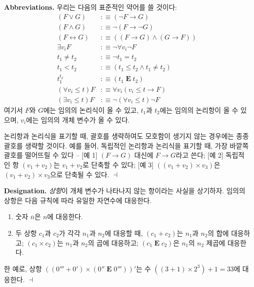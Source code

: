 \documentclass[12pt]{paper}
\newenvironment{context}[1][]{\noindent \textbf{{#1}.}}{\hfill $ \dashv $}
\begin{document}
  \begin{context}[Abbreviations]
    우리는 다음의 표준적인 약어를 쓸 것이다:
    \begin{align*}
      \left( F \lor G \right) & : \equiv \left( \lnot F \rightarrow G \right) \\
      \left( F \land G \right) & : \equiv \lnot \left( F \rightarrow \lnot G \right) \\
      \left( F \leftrightarrow G \right) & : \equiv \left( \left( F \rightarrow G \right) \land \left( G \rightarrow F \right) \right) \\
      \exists v_{i} F & : \equiv \lnot \forall v_{i} \lnot F \\
      t_{1} \neq t_{2} & : \equiv \lnot t_{1} = t_{2} \\
      t_{1} < t_{2} & : \equiv \left( t_{1} \leq t_{2} \land t_{1} \neq t_{2} \right) \\
      t_{1}^{t_{2}} & : \equiv \left( t_{1} \mathop{\mathbf{E}} t_{2} \right) \\
      \left( \forall v_{i} \leq t \right) F & : \equiv \forall v_{i} \left( v_{i} \leq t \rightarrow F \right) \\
      \left( \exists v_{i} \leq t \right) F & : \equiv \lnot \left( \forall v_{i} \leq t \right) \lnot F
    \end{align*}
    여기서 $F$와 $G$에는 임의의 논리식이 올 수 있고,
    $t_{1}$과 $t_{2}$에는 임의의 논리항이 올 수 있으며,
    $v_{i}$에는 임의의 개체 변수가 올 수 있다.

    논리항과 논리식을 표기할 때,
    괄호를 생략하여도 모호함이 생기지 않는 경우에는 종종 괄호를 생략할 것이다.
    예를 들어, 독립적인 논리항과 논리식을 표기할 때, 가장 바깥쪽 괄호를 떨어뜨릴 수 있다 --
    [예 1] $\left( F \rightarrow G \right)$ 대신에 $F \rightarrow G$라고 쓴다;
    [예 2] 독립적인 항 $\left( v_{1} + v_{2} \right)$는 $v_{1} + v_{2}$로 단축할 수 있다;
    [예 3] $\left( \left( v_{1} + v_{2} \right) \times v_{3} \right)$은 $\left( v_{1} + v_{2} \right) \times v_{3}$으로 단축될 수 있다.
  \end{context}

  \begin{context}[Designation]
    \textit{상항}이 개체 변수가 나타나지 않는 항이라는 사실을 상기하자.
    임의의 상항은 다음 규칙에 따라 유일한 자연수에 대응한다.
    \begin{enumerate}
      \item 숫자 $\overline{n}$은 $n$에 대응한다.
      \item 두 상항 $c_{1}$과 $c_{2}$가 각각 $n_{1}$과 $n_{2}$에 대응할 때,
      $\left( c_{1} + c_{2} \right)$는 $n_{1}$과 $n_{2}$의 합에 대응하고;
      $\left( c_{1} \times c_{2} \right)$는 $n_{1}$과 $n_{2}$의 곱에 대응하고;
      $\left( c_{1} \mathop{\mathbf{E}} c_{2} \right)$은 $n_{1}$의 $n_{2}$ 제곱에 대응한다.
    \end{enumerate}

    한 예로, 상항 $\left( \left( 0''' + 0' \right) \times \left( 0'' \mathop{\mathbf{E}} 0''' \right) \right) '$는
    수 $\left( \left( 3 + 1 \right) \times 2^{3} \right) + 1 = 33$에 대응한다.
  \end{context}
\end{document}
